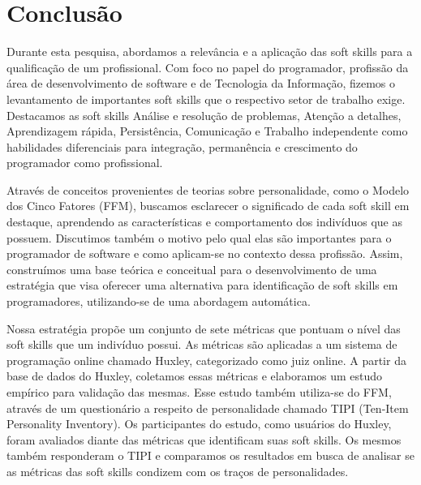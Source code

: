 

\chapter{Conclusão}

\label{chap:conclusion}

Durante esta pesquisa, abordamos a relevância e a aplicação das soft skills para a qualificação de um profissional. Com foco no papel do programador, profissão da área de desenvolvimento de software e de Tecnologia da Informação, fizemos o levantamento de importantes soft skills que o respectivo setor de trabalho exige. Destacamos as soft skills Análise e resolução de problemas, Atenção a detalhes, Aprendizagem rápida, Persistência, Comunicação e Trabalho independente como habilidades diferenciais para integração, permanência e crescimento do programador como profissional.

Através de conceitos provenientes de teorias sobre personalidade, como o Modelo dos Cinco Fatores (FFM), buscamos esclarecer o significado de cada soft skill em destaque, aprendendo as características e comportamento dos indivíduos que as possuem. Discutimos também o motivo pelo qual elas são importantes para o programador de software e como aplicam-se no contexto dessa profissão. Assim, construímos uma base teórica e conceitual para o desenvolvimento de uma estratégia que visa oferecer uma alternativa para identificação de soft skills em programadores, utilizando-se de uma abordagem automática.

Nossa estratégia propõe um conjunto de sete métricas que pontuam o nível das soft skills que um indivíduo possui. As métricas são aplicadas a um sistema de programação online chamado Huxley, categorizado como juiz online. A partir da base de dados do Huxley, coletamos essas métricas e elaboramos um estudo empírico para validação das mesmas. Esse estudo também utiliza-se do FFM, através de um questionário a respeito de personalidade chamado TIPI (Ten-Item Personality Inventory). Os participantes do estudo, como usuários do Huxley, foram avaliados diante das métricas que identificam suas soft skills. Os mesmos também responderam o TIPI e comparamos os resultados em busca de analisar se as métricas das soft skills condizem com os traços de personalidades.

